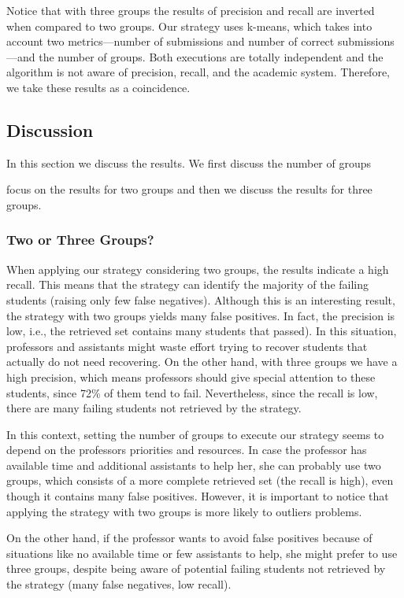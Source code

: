 Notice that with three groups the results of precision and recall are inverted when compared to two groups. Our strategy uses k-means, which takes into account two metrics---number of submissions and number of correct submissions---and the number of groups. Both executions are totally independent and the algorithm is not aware of precision, recall, and the academic system. Therefore, we take these results as a coincidence.

\subsection{Discussion}

In this section we discuss the results. We first discuss the number of groups

focus on the results for two groups and then we discuss the results for three groups.

\subsubsection{Two or Three Groups?}

When applying our strategy considering two groups, the results indicate a high recall. This means that the strategy can identify the majority of the failing students (raising only few false negatives). Although this is an interesting result, the strategy with two groups yields many false positives. In fact, the precision is low, i.e., the retrieved set contains many students that passed). In this situation, professors and assistants might waste effort trying to recover students that actually do not need recovering. On the other hand, with three groups we have a high precision, which means professors should give special attention to these students, since 72\% of them tend to fail. Nevertheless, since the recall is low, there are many failing students not retrieved by the strategy.

In this context, setting the number of groups to execute our strategy seems to depend on the professors priorities and resources. In case the professor has available time and additional assistants to help her, she can probably use two groups, which consists of a more complete retrieved set (the recall is high), even though it contains many false positives. However, it is important to notice that applying the strategy with two groups is more likely to outliers problems.

On the other hand, if the professor wants to avoid false positives because of situations like no available time or few assistants to help, she might prefer to use three groups, despite being aware of potential failing students not retrieved by the strategy (many false negatives, low recall). 

